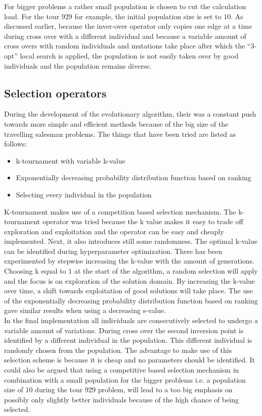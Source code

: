 \documentclass[a4paper,10pt]{article}
\begin{document}
For bigger problems a rather small population is chosen to cut the calculation load. For the tour $929$ for example, the initial population size is set to $ 10 $. As discussed earlier, because the inver-over operator only copies one edge at a time during cross over with a different individual and because a variable amount of cross overs with random individuals and mutations take place after which the ``3-opt'' local search is applied, the population is not easily taken over by good individuals and the population remains diverse.


\subsection{Selection operators}

During the development of the evolutionary algorithm, their was a constant push towards more simple and efficient methods because of the big size of the travelling salesman problems. The things that have been tried are listed as follows:

\begin{itemize}
	\item k-tournament with variable k-value
	\item Exponentially decreasing probability distribution function based on ranking
	\item Selecting every individual in the population 
\end{itemize}

K-tournament makes use of a competition based selection mechanism. The k-tournament operator was tried because the k value makes it easy to trade off exploration and exploitation and the operator can be easy and cheaply implemented. Next, it also introduces still some randomness. The optimal k-value can be identified during hyperparameter optimization. There has been experimented by stepwise increasing the k-value with the amount of generations. Choosing k equal to $1$ at the start of the algorithm, a random selection will apply and the focus is on exploration of the solution domain. By increasing the k-value over time, a shift towards exploitation of good solutions will take place. The use of the exponentially decreasing probability distribution function based on ranking gave similar results when using a decreasing s-value.\\

In the final implementation all individuals are consecutively selected to undergo a variable amount of variations. During cross over the second inversion point is identified by a different individual in the population. This different individual is randomly chosen from the population. The advantage to make use of this selection scheme is because it is cheap and no parameters should be identified. It could also be argued that using a competitive based selection mechanism in combination with a small population for the bigger problems i.e. a population size of $10$ during the tour 929 problem, will lead to a too big emphasis on possibly only slightly better individuals because of the high chance of being selected. 
\end{document}
